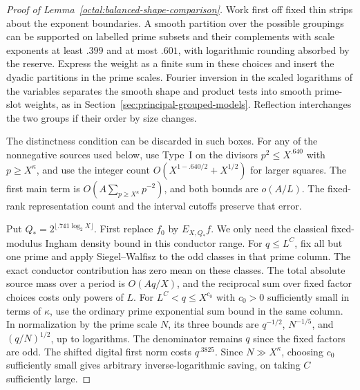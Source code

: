 \documentclass[11pt,a4paper]{article}
\theoremstyle{paperplain}
\numberwithin{equation}{section}
\begin{document}
\begin{proof}[Proof of Lemma~\ref{octal:balanced-shape-comparison}]
Work first off fixed thin strips about the exponent boundaries. A
smooth partition over the possible groupings can be supported on
labelled prime subsets and their complements with scale exponents
at least $.399$ and at most $.601$, with logarithmic rounding
absorbed by the reserve. Express the weight as a finite sum in
these choices and insert the dyadic partitions in the prime scales.
Fourier inversion in the scaled logarithms of the variables separates
the smooth shape and product tests into smooth prime-slot weights,
as in Section~\ref{sec:principal-grouped-models}.
Reflection interchanges the two groups
if their order by size changes.

The distinctness condition can be discarded in such boxes. For
any of the nonnegative sources used below, use Type~I on the
divisors $p^2\le X^{.640}$ with $p\ge X^\kappa$, and use the
integer count $O(X^{1-.640/2}+X^{1/2})$ for larger squares.
The first main term is $O(A\sum_{p\ge X^\kappa}p^{-2})$, and
both bounds are $o(A/L)$. The fixed-rank representation count
and the interval cutoffs preserve that error.

Put $Q_*=2^{\lfloor .741\log_2 X\rfloor}$. First replace $f_0$
by $E_{X,Q_*}f$. We only need the classical fixed-modulus Ingham
density bound in this conductor range. For $q\le L^C$, fix all but one
prime and apply Siegel--Walfisz to the odd classes in that prime
column. The exact conductor contribution has zero mean on these
classes. The total absolute source mass over a period is
$O(Aq/X)$, and the reciprocal sum over fixed factor choices costs
only powers of $L$. For $L^C<q\le X^{c_0}$ with $c_0>0$ sufficiently
small in terms of $\kappa$, use the ordinary prime exponential
sum bound \cite[Theorem~23.8]{Koukoulopoulos2019} in the same column. In normalization
by the prime scale $N$, its three bounds are $q^{-1/2}$, $N^{-1/5}$, and
$(q/N)^{1/2}$, up to logarithms. The denominator remains $q$ since the
fixed factors are odd. The shifted digital first norm costs $q^{.3825}$.
Since $N\gg X^\kappa$, choosing $c_0$ sufficiently small gives arbitrary
inverse-logarithmic saving, on taking $C$ sufficiently large.


\end{proof}
\end{document}
